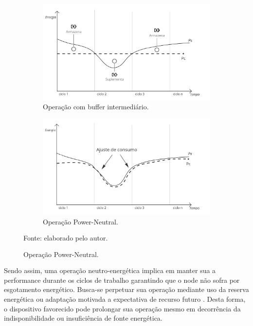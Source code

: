 \begin{figure}[H]
	\centering
	\caption{Dinâmicas de operação com coleta de energia} \label{fig:dinamicas}
	\begin{subfigure}{0.49\textwidth}
		\caption{Operação com buffer intermediário.}
		\label{fig:cap2energyneutraloperation}
		\includegraphics[width=\linewidth]{Imagens/cap2/cap2energyneutraloperation.jpg}	
	\end{subfigure}%
	\hspace*{\fill}  
	\begin{subfigure}{0.49\textwidth}
		\caption{Operação Power-Neutral.}
		\label{fig:cap2powerneutraloperation}
		\includegraphics[width=\linewidth]{Imagens/cap2/cap2powerneutraloperation.jpg}
	\end{subfigure}%
	\hspace*{\fill}   
	
	Fonte: elaborado pelo autor.
\end{figure}

Sendo assim, uma operação neutro-energética implica em manter sua a performance durante os ciclos de trabalho garantindo que o node não sofra por esgotamento energético. Busca-se perpetuar sua operação mediante uso da reserva energética ou adaptação motivada a expectativa de recurso futuro \cite{sudevalayam_energy_2011}. Desta forma, o dispositivo favorecido pode prolongar sua operação mesmo em decorrência da indisponibilidade ou insuficiência de fonte energética.

